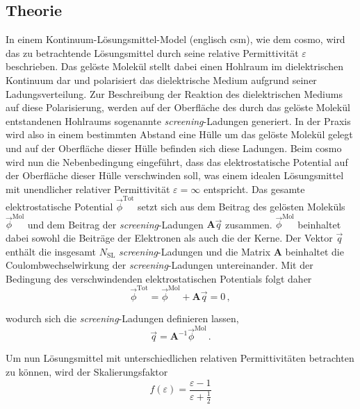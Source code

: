 	\subsection{Theorie}\label{kap:cosmotheo}
	In einem Kontinuum-Lösungsmittel-Model (englisch \ac{csm}), wie dem \ac{cosmo}, wird das zu betrachtende Lösungsmittel durch seine relative Permittivität $\varepsilon$ beschrieben. Das gelöste Molekül stellt dabei einen Hohlraum im dielektrischen Kontinuum dar und polarisiert das dielektrische Medium aufgrund seiner Ladungsverteilung. Zur Beschreibung der Reaktion des dielektrischen Mediums auf diese Polarisierung, werden auf der Oberfläche des durch das gelöste Molekül entstandenen Hohlraums sogenannte \textit{screening}-Ladungen generiert. In der Praxis wird also in einem bestimmten Abstand eine Hülle um das gelöste Molekül gelegt und auf der Oberfläche dieser Hülle befinden sich diese Ladungen. Beim \ac{cosmo} wird nun die Nebenbedingung eingeführt, dass das elektrostatische Potential auf der Oberfläche dieser Hülle verschwinden soll, was einem idealen Lösungsmittel mit unendlicher relativer Permittivität $\varepsilon=\infty$ entspricht. Das gesamte elektrostatische Potential $\vec{\phi}^{\textrm{Tot}}$ setzt sich aus dem Beitrag des gelösten Moleküls $\vec{\phi}^{\textrm{Mol}}$ und dem Beitrag der \textit{screening}-Ladungen $\boldsymbol{A}\vec{q}$ zusammen. $\vec{\phi}^{\textrm{Mol}}$ beinhaltet dabei sowohl die Beiträge der Elektronen als auch die der Kerne. Der Vektor $\vec{q}$ enthält die insgesamt $N_{\textrm{SL}}$ \textit{screening}-Ladungen und die Matrix $\boldsymbol{A}$ beinhaltet die Coulombwechselwirkung der \textit{screening}-Ladungen untereinander. Mit der Bedingung des verschwindenden elektrostatischen Potentials folgt daher
	\begin{equation}
	\vec{\phi}^{\textrm{Tot}}=\vec{\phi}^{\textrm{Mol}}+\boldsymbol{A}\vec{q}=0\, ,
	\end{equation}
	
wodurch sich die \textit{screening}-Ladungen definieren lassen,
	\begin{equation}
	\vec{q}=\boldsymbol{A}^{-1}\vec{\phi}^{\textrm{Mol}}\, .
	\end{equation}
	
Um nun Lösungsmittel mit unterschiedlichen relativen Permittivitäten betrachten zu können, wird der Skalierungsfaktor 
	\begin{equation}
	f(\varepsilon)=\frac{\varepsilon-1}{\varepsilon+\frac{1}{2}}
	\end{equation}
	
